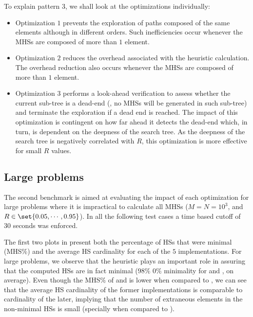 To explain pattern 3, we shall look at the optimizations individually:
%
\begin{itemize}[nolistsep]
\item Optimization $1$ prevents the exploration of paths composed of
  the same elements although in different orders. Such inefficiencies
  occur whenever the \acp{MHS} are composed of more than $1$ element.
\item Optimization $2$ reduces the overhead associated with the
  heuristic calculation. The overhead reduction also occurs whenever
  the \acp{MHS} are composed of more than $1$ element.
\item Optimization $3$ performs a look-ahead verification to assess
  whether the current sub-tree is a dead-end (\ie, no \acp{MHS} will
  be generated in such sub-tree) and terminate the exploration if a
  dead end is reached. The impact of this optimization is contingent
  on how far ahead it detects the dead-end which, in turn, is
  dependent on the deepness of the search tree. As the deepness of the
  search tree is negatively correlated with $R$, this optimization is
  more effective for small $R$ values.
\end{itemize}

\subsection{Large problems}
\label{sec:mhs2o:results:large}
The second benchmark is aimed at evaluating the impact of each
optimization for large problems where it is impractical to calculate
all \acp{MHS} ($M = N = 10^3$, and $R \in \set{0.05,\cdots,0.95}$).
%
In all the following test cases a time based cutoff of $30$ seconds
was enforced.


The first two plots in  present both the
percentage of \acp{HS} that were minimal (\ac{MHS}\%) and the average
\ac{HS} cardinality for each of the $5$ implementations.
%
For large problems, we observe that the heuristic plays an important
role in assuring that the computed \acp{HS} are in fact minimal
($98\%$ \vs{} $0\%$ minimality for  and
, on average).
%
Even though the \ac{MHS}\% of  and  is lower
when compared to , we can see that the average \ac{HS}
cardinality of the former implementations is comparable to cardinality
of the later, implying that the number of extraneous elements in the
non-minimal \acp{HS} is small (specially when compared to
).

